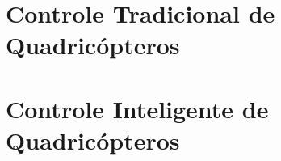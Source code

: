 %
%
\section{Controle Tradicional de Quadricópteros}
\label{sec:trab-rel-tradicional}



\section{Controle Inteligente de Quadricópteros}
\label{sec:trab-rel-inteligente}



%
